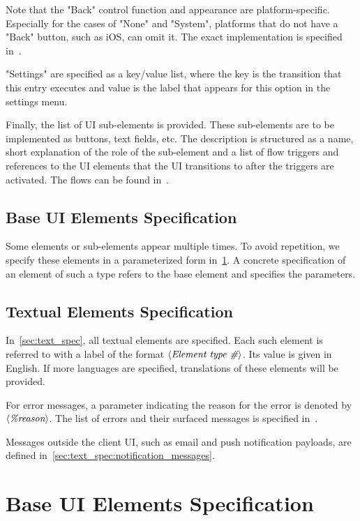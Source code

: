 \documentclass[a4paper,10pt]{article}
\begin{document}
Note that the "Back" control function and appearance are platform-specific. 
Especially for the cases of "None" and "System", platforms that do not have a 
"Back" button, such as iOS, can omit it. The exact implementation is specified 
in~\cite{UI_design_spec}.

"Settings" are specified as a key/value list, where the key is the transition 
that this entry executes and value is the label that appears for this option in 
the settings menu.

Finally, the list of UI sub-elements is provided. These sub-elements are to be 
implemented as buttons, text fields, etc. The description is structured as a 
name, short explanation of the role of the sub-element and a list of flow 
triggers and references to the UI elements that the UI transitions to after the 
triggers are activated. The flows can be found in~\cite{flow_spec}.

\subsection{Base UI Elements Specification}
Some elements or sub-elements appear multiple times. To avoid repetition, we 
specify these elements in a parameterized form in~\ref{sec:base_element_spec}. 
A concrete specification of an element of such a type refers to the base 
element and specifies the parameters.

\subsection{Textual Elements Specification}
In~\ref{sec:text_spec}, all textual elements are specified. Each such element 
is referred to with a label of the format $\langle\emph{Element type 
\#}\rangle$. Its value is given in English. If more languages are specified, 
translations of these elements will be provided.

For error messages, a parameter indicating the reason for the error is denoted 
by $\langle\emph{\%reason}\rangle$. The list of errors and their surfaced 
messages is specified in~\cite{error_code_spec}.

Messages outside the client UI, such as email and push notification payloads, 
are defined in~\ref{sec:text_spec:notification_messages}.

\section{Base UI Elements Specification}
\label{sec:base_element_spec}
\end{document}
